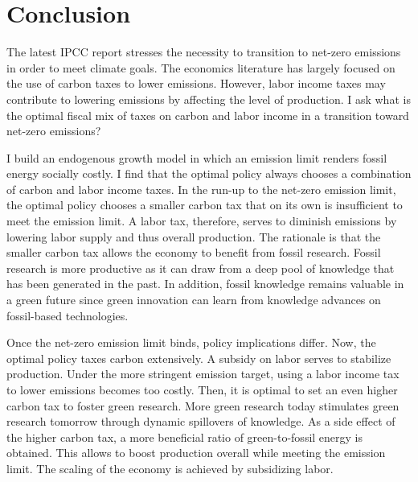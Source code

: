 \section{Conclusion}\label{sec:con3}
The latest IPCC report \citep{IPCC2022} stresses the necessity to transition to net-zero emissions in order to meet climate goals. The economics literature has largely focused on the use of carbon taxes to lower emissions.  However, labor income taxes may contribute to lowering emissions by affecting the level of production. I ask what is the optimal fiscal mix of taxes on carbon and labor income in a transition toward net-zero emissions?

I build an endogenous growth model in which an emission limit renders fossil energy socially costly. I find that the optimal policy always chooses a combination of carbon and labor income taxes. 
In the run-up to the net-zero emission limit, the optimal policy chooses a smaller carbon tax that on its own is insufficient to meet the emission limit.  A labor tax, therefore, serves to diminish emissions by lowering labor supply and thus overall production. The rationale is that the smaller carbon tax allows the economy to benefit from fossil research. Fossil research is more productive as it can draw from a deep pool of knowledge that has been generated in the past. In addition, fossil knowledge remains valuable in a green future since green innovation can learn from 
knowledge advances on fossil-based technologies.

Once the net-zero emission limit binds, policy implications differ. Now, the optimal policy taxes carbon extensively. A subsidy on labor serves to stabilize production.
Under the  more stringent emission target, using a labor income tax to lower emissions becomes too costly. Then, it is optimal to set an even higher carbon tax to foster green research. More green research today stimulates green research tomorrow through dynamic spillovers of knowledge. As a side effect of the higher carbon tax, a more beneficial ratio of green-to-fossil energy is obtained. This allows to boost production overall while meeting the emission limit. The scaling of the economy is achieved by subsidizing labor. 


